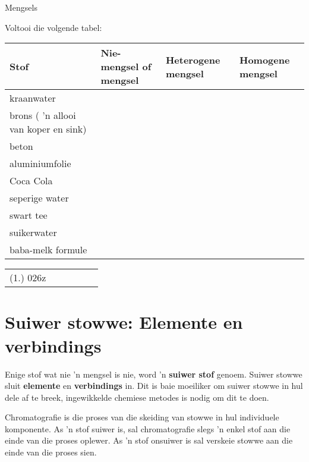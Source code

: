 \begin{exercises}{Mengsels} 
{Voltooi die volgende tabel:\par
\hspace{-3cm}
\begin{tabular}{|l|p{2.5cm}|p{2.5cm}|p{2.5cm}|}\hline
\textbf{Stof} & \textbf{Nie-mengsel of mengsel} & \textbf{Heterogene mengsel} & \textbf{Homogene mengsel} \\ \hline
kraanwater & & & \\ \hline
brons ( 'n allooi van koper en sink) & & & \\ \hline
beton & & & \\ \hline
aluminiumfolie & & & \\ \hline
Coca Cola & & & \\ \hline
seperige water & & & \\ \hline
swart tee & & & \\ \hline
suikerwater & & & \\ \hline
baba-melk formule & & & \\ \hline
\end{tabular}
\vspace{-.5cm}
\practiceinfo \vspace{-.5cm}
\begin{tabular}[h]{cccccc}
 (1.) 026z  &
\end{tabular} 
}
\end{exercises}


\section{Suiwer stowwe: Elemente en verbindings}
\nopagebreak
Enige stof wat nie 'n mengsel is nie, word 'n \textbf{suiwer stof} genoem. Suiwer stowwe sluit \textbf{elemente} en \textbf{verbindings} in. Dit is baie moeiliker om suiwer stowwe in hul dele af te breek, ingewikkelde chemiese metodes is nodig om dit te doen.\par


Chromatografie is die proses van die skeiding van stowwe in hul individuele komponente. As 'n stof suiwer is, sal chromatografie slegs 'n enkel stof aan die einde van die proses oplewer. As 'n stof onsuiwer is sal verskeie stowwe aan die einde van die proses sien.\par

